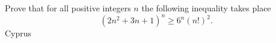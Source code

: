 Prove that for all positive integers $n$ the following inequality takes place  \[ (2n^2+3n+1)^n \geq 6^n (n!)^2 . \]Cyprus